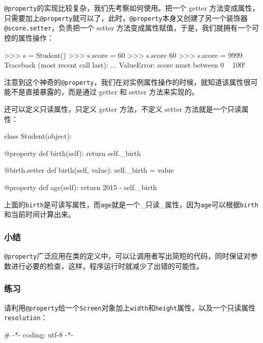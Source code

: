 \texttt{@property}的实现比较复杂，我们先考察如何使用。把一个 getter
方法变成属性，只需要加上\texttt{@property}就可以了，此时，\texttt{@property}本身又创建了另一个装饰器\texttt{@score.setter}，负责把一个
setter 方法变成属性赋值，于是，我们就拥有一个可控的属性操作：

\begin{pythoncode}
>>> s = Student()
>>> s.score = 60 
>>> s.score 
60
>>> s.score = 9999
Traceback (most recent call last):
  ...
ValueError: score must between 0 ~ 100!
\end{pythoncode}

注意到这个神奇的\texttt{@property}，我们在对实例属性操作的时候，就知道该属性很可能不是直接暴露的，而是通过
getter 和 setter 方法来实现的。

还可以定义只读属性，只定义 getter 方法，不定义 setter
方法就是一个只读属性：

\begin{pythoncode}
class Student(object):

    @property
    def birth(self):
        return self._birth

    @birth.setter
    def birth(self, value):
        self._birth = value

    @property
    def age(self):
        return 2015 - self._birth
\end{pythoncode}

上面的\texttt{birth}是可读写属性，而\texttt{age}就是一个\_只读\_属性，因为\texttt{age}可以根据\texttt{birth}和当前时间计算出来。

\hypertarget{ux5c0fux7ed3}{%
\subsubsection{小结}\label{ux5c0fux7ed3}}

\texttt{@property}广泛应用在类的定义中，可以让调用者写出简短的代码，同时保证对参数进行必要的检查，这样，程序运行时就减少了出错的可能性。

\hypertarget{ux7ec3ux4e60}{%
\subsubsection{练习}\label{ux7ec3ux4e60}}

请利用\texttt{@property}给一个\texttt{Screen}对象加上\texttt{width}和\texttt{height}属性，以及一个只读属性\texttt{resolution}：

\begin{pythoncode}
# -*- coding: utf-8 -*-
\end{pythoncode}

